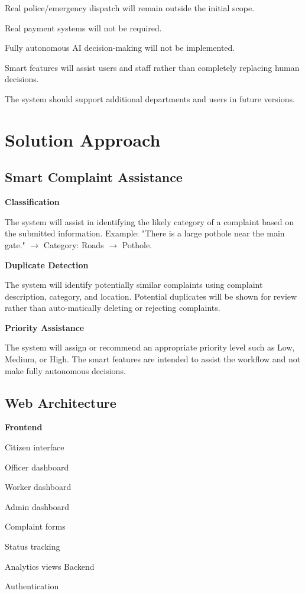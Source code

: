 \documentclass[12pt,a4paper]{article}
\begin{document}
Real police/emergency dispatch will remain outside the initial scope.

Real payment systems will not be required.

Fully autonomous AI decision-making will not be implemented.

Smart features will assist users and staff rather than completely replacing human decisions.

The system should support additional departments and users in future versions.

\section{Solution Approach}
\subsection{Smart Complaint Assistance}
\textbf{Classification}\par
The system will assist in identifying the likely category of a complaint based on the submitted information. Example: "There is a large pothole near the main gate." $\rightarrow$ Category: Roads $\rightarrow$ Pothole.

\textbf{Duplicate Detection}\par
The system will identify potentially similar complaints using complaint description, category, and location. Potential duplicates will be shown for review rather than auto-matically deleting or rejecting complaints.

\textbf{Priority Assistance}\par
The system will assign or recommend an appropriate priority level such as Low, Medium, or High. The smart features are intended to assist the workflow and not make fully autonomous decisions.

\subsection{Web Architecture}
\textbf{Frontend}\par
Citizen interface

Officer dashboard

Worker dashboard

Admin dashboard

Complaint forms

Status tracking

Analytics views Backend

Authentication
\end{document}
